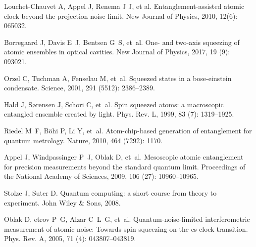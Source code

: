 \begin{thebibliography}{113}
	Louchet-Chauvet A, Appel J, Renema J J, et al.
	\newblock Entanglement-assisted atomic clock beyond the projection noise limit\allowbreak[J].
	\newblock New Journal of Physics, 2010, 12(6): 065032.
		
	Borregaard J, Davis E~J, Bentsen G~S, et~al.
	\newblock One- and two-axis squeezing of atomic ensembles in optical
	cavities\allowbreak[J].
	\newblock New Journal of Physics, 2017, 19 (9): 093021.
	
	Orzel C, Tuchman A, Fenselau M, et~al.
	\newblock Squeezed states in a bose-einstein condensate\allowbreak[J].
	\newblock Science, 2001, 291 (5512): 2386--2389.
	
	Hald J, S{\o}rensen J, Schori C, et~al.
	\newblock Spin squeezed atoms: a macroscopic entangled ensemble created by
	light\allowbreak[J].
	\newblock Phys. Rev. L, 1999, 83 (7): 1319--1925.
	
	Riedel M~F, B{\"o}hi P, Li Y, et~al.
	\newblock Atom-chip-based generation of entanglement for quantum
	metrology\allowbreak[J].
	\newblock Nature, 2010, 464 (7292): 1170.
	
	Appel J, Windpassinger P~J, Oblak D, et~al.
	\newblock Mesoscopic atomic entanglement for precision measurements beyond the
	standard quantum limit\allowbreak[J].
	\newblock Proceedings of the National Academy of Sciences, 2009, 106
	(27): 10960--10965.
	
	Stolze J, Suter D.
	\newblock Quantum computing: a short course from theory to
	experiment\allowbreak[M]. John Wiley \& Sons, 2008.
	
	Oblak D, etrov P~G, Alzar C~L~G, et~al.
	\newblock Quantum-noise-limited interferometric measurement of atomic noise:
	Towards spin squeezing on the cs clock transition\allowbreak[J].
	\newblock Phys. Rev. A, 2005, 71 (4): 043807--043819.
	

\end{thebibliography}
